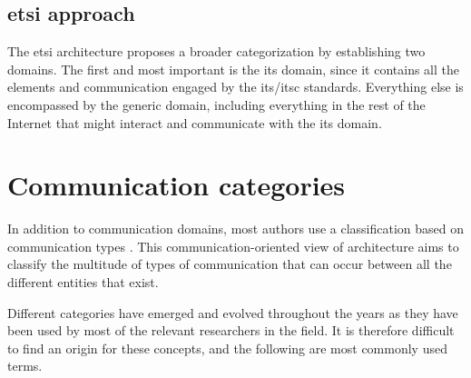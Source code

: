 \subsection[ETSI approach]{\gls{etsi} approach}
The \gls{etsi} architecture proposes a broader categorization by establishing two domains. 
The first and most important is the \gls{its} domain, since it contains all the elements and communication engaged by the \gls{its}/\gls{itsc} standards. 
Everything else is encompassed by the generic domain, including everything in the rest of the Internet that might interact and communicate with the \gls{its} domain.


\section{Communication categories}
\label{sec:VANET_communication_categories}

In addition to communication domains, most authors use a classification based on communication types \cite{c2c-cc_car_2007} \cite{jakubiak_state_2008} \cite{toor_vehicle_2008} \cite{faezipour_progress_2012} \cite{soriga_its-g5_2012} \cite{al-sultan_comprehensive_2014} \cite{anwer_survey_2014} \cite{festag_standards_2015} \cite{harri_multi-channel_2015} \cite{liang_vehicular_2015} \cite{asselin-miller_study_2016} \cite{rohde__schwarz_intelligent_2019} \cite{weber_c-v2x_2019} \cite{gyawali_challenges_2021} \cite{sedar_standards-compliant_2021} \cite{tahir_poster_2021}. This communication-oriented view of architecture aims to classify the multitude of types of communication that can occur between all the different entities that exist.

Different categories have emerged and evolved throughout the years as they have been used by most of the relevant researchers in the field. It is therefore difficult to find an origin for these concepts, and the following are most commonly used terms.


